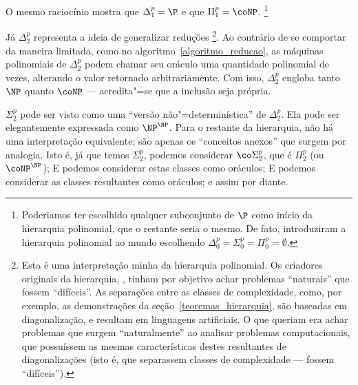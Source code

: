 O mesmo raciocínio mostra que $\Delta_1^p = \P$
e que $\Pi_1^p = \coNP$.
\footnote{
    Poderiamos ter escolhido qualquer subconjunto de $\P$
    como início da hierarquia polinomial,
    que o restante seria o mesmo.
    De fato, 
    introduziram a hierarquia polinomial ao mundo
    escolhendo $\Delta_0^p = \Sigma_0^p = \Pi_0^p = \emptyset$.
}

Já $\Delta_2^p$ representa a ideia de generalizar reduções%
\footnote{
    Esta é uma interpretação minha da hierarquia polinomial.
    Os criadores originais da hierarquia,
    ,
    tinham por objetivo achar problemas ``naturais''
    que fossem ``difíceis''.
    As separações entre as classes de complexidade,
    como, por exemplo, as demonstrações da seção~\ref{teoremas_hierarquia},
    são baseadas em diagonalização,
    e resultam em linguagens artificiais.
    O que  queriam
    era achar problemas que surgem ``naturalmente''
    ao analisar problemas computacionais,
    que possuíssem as mesmas características
    destes resultantes de diagonalizações
    (isto é, que separassem classes de complexidade
    --- fossem ``difíceis'').
}.
Ao contrário de se comportar da maneira limitada,
como no algoritmo~\ref{algoritmo_reducao},
as máquinas polinomiais de $\Delta_2^p$
podem chamar seu oráculo uma quantidade polinomial de vezes,
alterando o valor retornado arbitrariamente.
Com isso, $\Delta_2^p$ engloba tanto $\NP$ quanto $\coNP$
--- acredita"=se que a inclusão seja própria.

$\Sigma_2^p$ pode ser visto como uma ``versão não"=determinística'' de $\Delta_2^p$.
Ela pode ser elegantemente expressada como $\NP^\NP$.
Para o restante da hierarquia,
não há uma interpretação equivalente;
são apenas os ``conceitos anexos'' que surgem por analogia.
Isto é, já que temos $\Sigma_2^p$,
podemos considerar $\co \Sigma_2^p$, que é $\Pi_2^p$
(ou $\coNP^\NP$);
E podemos considerar estas classes como oráculos;
E podemos considerar as classes resultantes como oráculos;
e assim por diante.

